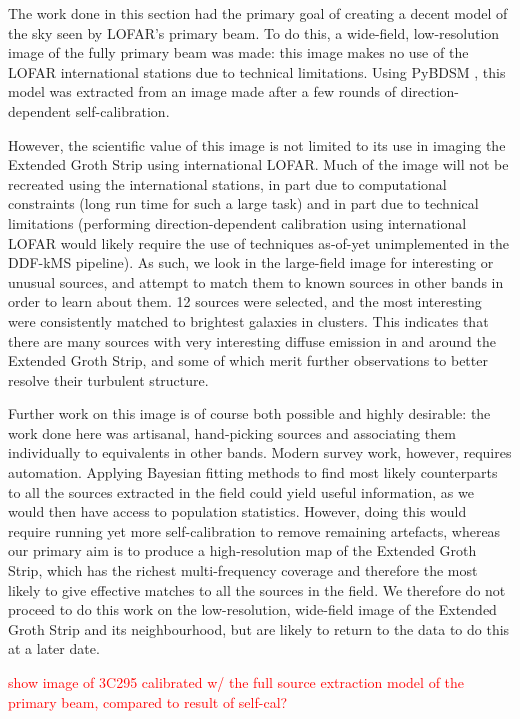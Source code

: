 \pg
The work done in this section had the primary goal of creating a decent model of the sky seen by LOFAR's primary beam. To do this, a wide-field, low-resolution image of the fully primary beam was made: this image makes no use of the LOFAR international stations due to technical limitations. Using PyBDSM , this model was extracted from an image made after a few rounds of direction-dependent self-calibration.

\pg
However, the scientific value of this image is not limited to its use in imaging the Extended Groth Strip using international LOFAR. Much of the image will not be recreated using the international stations, in part due to computational constraints (long run time for such a large task) and in part due to technical limitations (performing direction-dependent calibration using international LOFAR would likely require the use of techniques as-of-yet unimplemented in the DDF-kMS pipeline). As such, we look in the large-field image for interesting or unusual sources, and attempt to match them to known sources in other bands in order to learn about them. 12 sources were selected, and the most interesting were consistently matched to brightest galaxies in clusters. This indicates that there are many sources with very interesting diffuse emission in and around the Extended Groth Strip, and some of which merit further observations to better resolve their turbulent structure.

\pg
Further work on this image is of course both possible and highly desirable: the work done here was artisanal, hand-picking sources and associating them individually to equivalents in other bands. Modern survey work, however, requires automation. Applying Bayesian fitting methods to find most likely counterparts to all the sources extracted in the field could yield useful information, as we would then have access to population statistics. However, doing this would require running yet more self-calibration to remove remaining artefacts, whereas our primary aim is to produce a high-resolution map of the Extended Groth Strip, which has the richest multi-frequency coverage and therefore the most likely to give effective matches to all the sources in the field. We therefore do not proceed to do this work on the low-resolution, wide-field image of the Extended Groth Strip and its neighbourhood, but are likely to return to the data to do this at a later date.

\pg
\textcolor{red}{show image of 3C295 calibrated w/ the full source extraction model of the primary beam, compared to result of self-cal? }

\clearpage